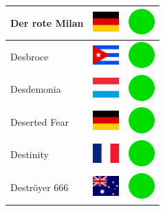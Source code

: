 \documentclass[12pt, a4paper, twoside]{report}
\begin{document}
\begin{center}
\begin{longtable}{|p{5cm}|p{2cm}|p{2cm}|}
 Der rote Milan                                             & \includegraphics[width=1cm]{../4x3/de} &   \includegraphics[width=1cm]{../likes/y} \\ \hline
 Desbroce                                                   & \includegraphics[width=1cm]{../4x3/cu} &   \includegraphics[width=1cm]{../likes/y} \\ \hline
 Desdemonia                                                 & \includegraphics[width=1cm]{../4x3/lu} &   \includegraphics[width=1cm]{../likes/y} \\ \hline
 Deserted Fear                                              & \includegraphics[width=1cm]{../4x3/de} &   \includegraphics[width=1cm]{../likes/y} \\ \hline
 Destinity                                                  & \includegraphics[width=1cm]{../4x3/fr} &   \includegraphics[width=1cm]{../likes/y} \\ \hline
 Deströyer 666                                              & \includegraphics[width=1cm]{../4x3/au} &   \includegraphics[width=1cm]{../likes/y} \\ \hline

\end{longtable}
\end{center}
\end{document}
